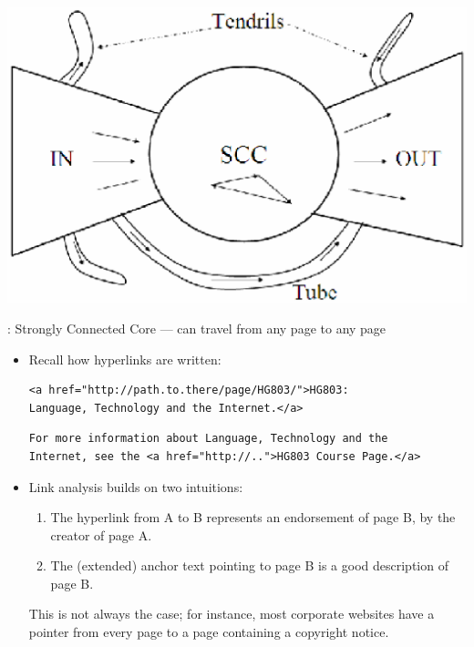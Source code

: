 \documentclass[a4paper,landscape,headrule,footrule,xetex]{foils}
\begin{document}

\begin{center}
\includegraphics[height=0.8\textheight]{../pics/web-bowtie-bw.eps}  
\end{center}
: Strongly Connected Core --- can travel from any page to any page



\begin{itemize}
\item Recall how hyperlinks are written: \vspace{-1ex}
\begin{verbatim}
<a href="http://path.to.there/page/HG803/">HG803: 
Language, Technology and the Internet.</a>
\end{verbatim}
\begin{verbatim}
For more information about Language, Technology and the
Internet, see the <a href="http://..">HG803 Course Page.</a>
\end{verbatim}
\item Link analysis builds on two intuitions:
  \begin{enumerate}
  \item The hyperlink from A to B represents an endorsement of page B, by the creator of page A.

  \item The (extended) anchor text pointing to page B is a good description of page B.
  \end{enumerate}
  \small {This is not always the case; for instance, most corporate websites have a pointer from every page to a page containing a copyright notice.}
\end{itemize}
\end{document}
